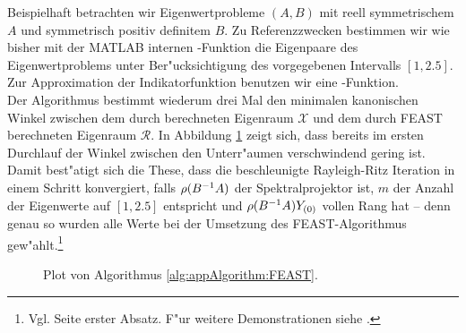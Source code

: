 \newpage

Beispielhaft betrachten wir Eigenwertprobleme $(A,B)$ mit reell symmetrischem $A$ und symmetrisch positiv definitem $B$.
Zu Referenzzwecken bestimmen wir wie bisher mit der MATLAB internen -Funktion die Eigenpaare des Eigenwertproblems unter Ber"ucksichtigung des vorgegebenen Intervalls $[1,2.5]$. Zur Approximation der Indikatorfunktion benutzen wir eine -Funktion.\\

Der Algorithmus bestimmt wiederum drei Mal den minimalen kanonischen Winkel zwischen dem durch  berechneten Eigenraum $\mathcal{X}$ und dem durch FEAST berechneten Eigenraum $\mathcal{R}$. In Abbildung \ref{fig:chap5:feast} zeigt sich, dass bereits im ersten Durchlauf der Winkel zwischen den Unterr"aumen verschwindend gering ist. Damit best"atigt sich die These, dass die beschleunigte Rayleigh-Ritz Iteration in einem Schritt konvergiert, falls $\rho(B^{-1}A)$ der Spektralprojektor ist, $m$ der Anzahl der Eigenwerte auf $[1,2.5]$ entspricht und $\rho(B^{-1}A)Y_{(0)}$ vollen Rang hat -- denn genau so wurden alle Werte bei der Umsetzung des FEAST-Algorithmus gew"ahlt.\footnote{Vgl. Seite \pageref{eq:quadratur} erster Absatz. F"ur weitere Demonstrationen siehe \cite{feast}.}

\begin{figure}[h!]
\centering


\caption{Plot von Algorithmus \ref{alg:appAlgorithm:FEAST}.}\label{fig:chap5:feast}
\end{figure}
